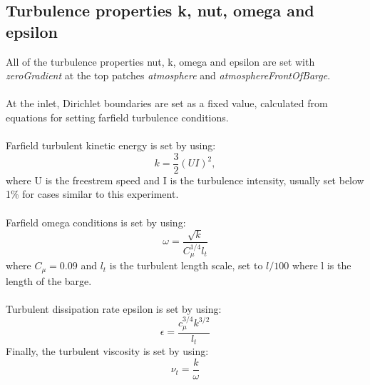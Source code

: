 \documentclass[a4paper, 12pt]{report}
\begin{document}
\subsection{Turbulence properties k, nut, omega and epsilon}
All of the turbulence properties nut, k, omega and epsilon are set with \textit{zeroGradient} at the top patches \textit{atmosphere} and \textit{atmosphereFrontOfBarge}.\\
\\
At the inlet, Dirichlet boundaries are set as a fixed value, calculated from equations for setting farfield turbulence conditions.\\
\\
Farfield turbulent kinetic energy is set by using:
\begin{equation}
k = \frac{3}{2}(UI)^2,
\label{eqn:turbulentKineticEnergy}
\end{equation}
where U is the freestrem speed and I is the turbulence intensity, usually set below 1\% for cases similar to this experiment. \\
\\
Farfield omega conditions is set by using:
\begin{equation}
\omega = \frac{\sqrt{k}}{C_{\mu}^{1/4}l_t}
\label{eqn:turbulentOmega}
\end{equation}
where $C_{\mu}=0.09$ and $l_t$ is the turbulent length scale, set to $l/100$ where l is the length of the barge.\\
\\
Turbulent dissipation rate epsilon is set by using:
\begin{equation}
\epsilon =  \frac{c_{\mu}^{3/4} k^{3/2}}{l_t}
\label{eqn:turbulentDissipationRate}
\end{equation}
Finally, the turbulent viscosity is set by using:
\begin{equation}
\nu_t = \frac{k}{\omega}
\label{eqn:turbulentViscosityFarfield}
\end{equation}
\end{document}
